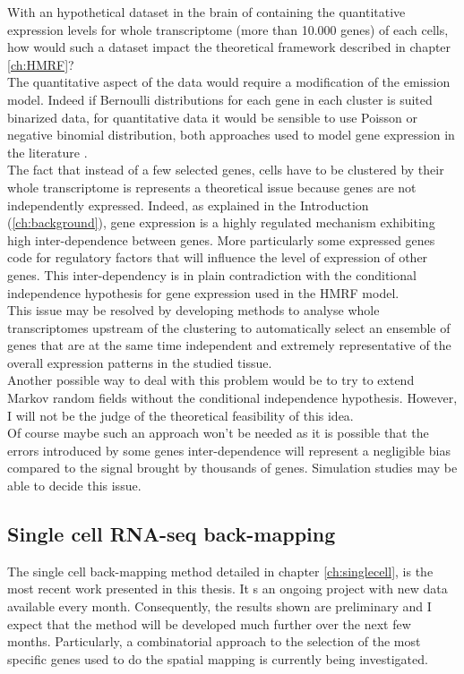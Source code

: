   With an hypothetical dataset in the brain of \platy{} containing the quantitative expression levels for whole transcriptome (more than 10.000 genes) of each cells, how would such a dataset impact the theoretical framework described in chapter \ref{ch:HMRF}?\\
  
  The quantitative aspect of the data would require a modification of the emission model. Indeed if Bernoulli distributions for each gene in each cluster is suited binarized data, for quantitative data it would be sensible to use Poisson or negative binomial distribution, both approaches used to model gene expression in the literature .\\
  
  The fact that instead of a few selected genes, cells have to be clustered by their whole transcriptome is represents a theoretical issue because genes are not independently expressed. Indeed, as explained in the Introduction (\ref{ch:background}), gene expression is a highly regulated mechanism exhibiting high inter-dependence between genes. More particularly some expressed genes code for regulatory factors that will influence the level of expression of other genes. This inter-dependency is in plain contradiction with the conditional independence hypothesis for gene expression used in the HMRF model.\\
  
  This issue may be resolved by developing methods to analyse whole transcriptomes upstream of the clustering to automatically select an ensemble of genes that are at the same time independent and extremely representative of the overall expression patterns in the studied tissue.\\
  
  Another possible way to deal with this problem would be to try to extend Markov random fields without the conditional independence hypothesis. However, I will not be the judge of the theoretical feasibility of this idea.\\
  
   Of course maybe such an approach won't be needed as it is possible that the errors introduced by some genes inter-dependence will represent a negligible bias compared to the signal brought by thousands of genes. Simulation studies may be able to decide this issue. 


  \subsection{Single cell RNA-seq back-mapping}
  The single cell back-mapping method detailed in chapter \ref{ch:singlecell}, is the most recent work presented in this thesis. It s an ongoing project with new data available every month. Consequently, the results shown are preliminary and I expect that the method will be developed much further over the next few months. Particularly, a combinatorial approach to the selection of the most specific genes used to do the spatial mapping is currently being investigated.



	



